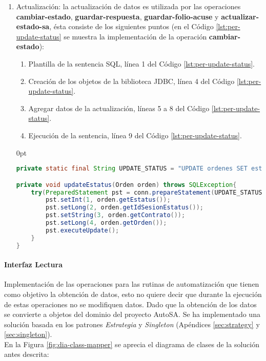 \begin{enumerate}
	\item Actualización: la actualización de datos es utilizada por las operaciones \textbf{cambiar-estado}, \textbf{guardar-respuesta}, \textbf{guardar-folio-acuse} y \textbf{actualizar-estado-sa}, ésta consiste de los siguientes puntos (en el Código \ref{lst:per-update-status} se muestra la implementación de la operación \textbf{cambiar-estado}):
	\begin{enumerate}
		\item Plantilla de la sentencia SQL, línea 1 del Código \ref{lst:per-update-status}.
		\item Creación de los objetos de la biblioteca JDBC, línea 4 del Código \ref{lst:per-update-status}.
		\item Agregar datos de la actualización, líneas 5 a 8 del Código \ref{lst:per-update-status}.
		\item Ejecución de la sentencia, línea 9 del Código \ref{lst:per-update-status}.
	\end{enumerate}

	\begin{adjustwidth}{\listingfixwidth}{0pt}
	\begin{lstlisting}[language=Java, caption={Actualización del estado de una orden de reposición.}, captionpos=b, label={lst:per-update-status}]
private static final String UPDATE_STATUS = "UPDATE ordenes SET estatus = ?, fecha_estatus = CURRENT_TIMESTAMP, id_sesion_estatus = ? WHERE contrato = ? AND orden = ?";

private void updateEstatus(Orden orden) throws SQLException{
	try(PreparedStatement pst = conn.prepareStatement(UPDATE_STATUS)){
		pst.setInt(1, orden.getEstatus());
		pst.setLong(2, orden.getIdSesionEstatus());
		pst.setString(3, orden.getContrato());
		pst.setLong(4, orden.getOrden());
		pst.executeUpdate();
	}
}
	\end{lstlisting}
	\end{adjustwidth}
\end{enumerate}

\paragraph{\indent Interfaz Lectura\\}
Implementación de las operaciones para las rutinas de automatización que tienen como objetivo la obtención de datos, esto no quiere decir que durante la ejecución de estas operaciones no se modifiquen datos.
Dado que la obtención de los datos se convierte a objetos del dominio del proyecto AutoSA. Se ha implementado una solución basada en los patrones \textit{Estrategia} y \textit{Singleton} (Apéndices \ref{sec:strategy} y \ref{sec:singleton}). \\
En la Figura \ref{fig:dia-class-mapper} se aprecia el diagrama de clases de la solución antes descrita:

